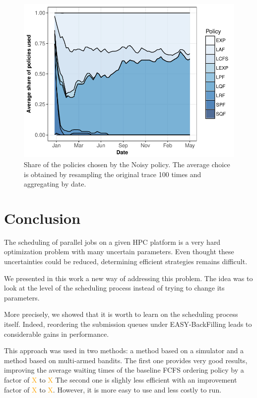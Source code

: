 \documentclass[sigconf,review]{acmart}
\begin{document}
\begin{figure}[ht]
  \centering
  \includegraphics[scale=0.6]{figures/mosaic-UniLu-Ga.pdf}

  \caption{Share of the policies chosen by the Noisy policy. The average choice
  is obtained by resampling the original trace 100 times and aggregating by
date.}

  \label{fig:mosn}
\end{figure}

\section{Conclusion}
\label{sec:ccl}

The scheduling of parallel jobs on a given HPC platform is a very hard
optimization problem with many uncertain parameters. Even thought these
uncertainties could be reduced, determining efficient strategies remains
difficult.

We presented in this work a new way of addressing this problem.  The idea was
to look at the level of the scheduling process instead of trying to change its
parameters.

More precisely, we showed that it is worth to learn on the scheduling process
itself. Indeed, reordering the submission queues under EASY-BackFilling leads
to considerable gains in performance.

This approach was used in two methods: a method based on a simulator and a
method based on multi-armed bandits. The first one provides very good results,
improving the average waiting times of the baseline FCFS ordering policy by a
factor of \textcolor{orange}{X} to \textcolor{orange}{X} The second one is
slighly less efficient with an improvement factor of  \textcolor{orange}{X} to
\textcolor{orange}{X}. However, it is more easy to use and less costly to run.
\end{document}

